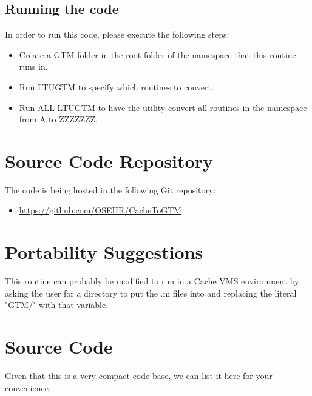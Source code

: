 \documentclass{OSEHRAArticle}
\newcommand{\lstlistingwithnumber}[3]{
\begin{center}

\end{center}
}
\begin{document}
\subsection{Running the code}

In order to run this code, please execute the following steps:

\begin{itemize}
\item Create a GTM folder in the root folder of the namespace that this routine runs in.
\item Run LTUGTM to specify which routines to convert.
\item Run ALL LTUGTM to have the utility convert all routines in the namespace from A to ZZZZZZZ.
\end{itemize}


\section{Source Code Repository}

The code is being hosted in the following Git repository:

\begin{itemize}
\item \url{https://github.com/OSEHR/CacheToGTM}
\end{itemize}


\section{Portability Suggestions}

This routine can probably be modified to run in a Cache VMS environment by
asking the user for a directory to put the .m files into and replacing the
literal "GTM/" with that variable.


\section{Source Code}

Given that this is a very compact code base, we can list it here for your convenience.

\lstlistingwithnumber{1}{71}{LTUGTM.RO}



%
%



\end{document}
